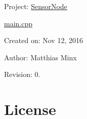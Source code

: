 Project\+: \hyperlink{namespaceSensorNode}{Sensor\+Node}

\hyperlink{main_8cpp}{main.\+cpp}

Created on\+: Nov 12, 2016

Author\+: Matthias Minx

Revision\+: 0.\hypertarget{main.cpp_License}{}\section{License}\label{main.cpp_License}
